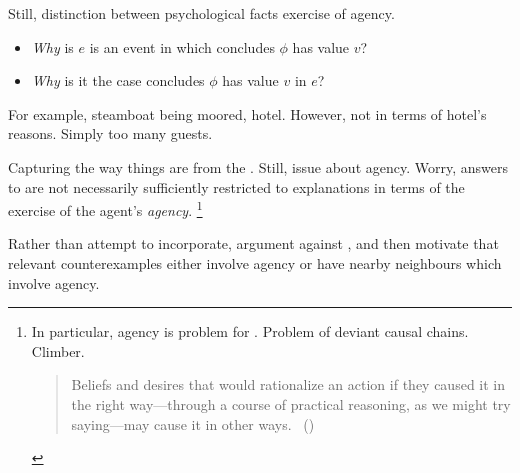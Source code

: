 \begin{note}
  Still, distinction between psychological facts exercise of agency.

  \begin{itemize}
  \item
    \emph{Why} is \(e\) is an event in which \vAgent{} concludes \(\phi\) has value \(v\)?
  \item
    \emph{Why} is it the case \vAgent{} concludes \(\phi\) has value \(v\) in \(e\)?
  \end{itemize}

  For example, steamboat being moored, hotel.
  However, not in terms of hotel's reasons.
  Simply too many guests.

  Capturing the way things are from the \agpe{}.
  Still, issue about agency.
  Worry, answers to \qWhy{} are not necessarily sufficiently restricted to explanations in terms of the exercise of the agent's \emph{agency}.%
  \footnote{
    In particular, agency is problem for \citeauthor{Davidson:1963aa}.
    Problem of deviant causal chains.
    \citeauthor[79]{Davidson:1973vd}
    Climber.
    \begin{quote}
      Beliefs and desires that would rationalize an action if they caused it in the right way—through a course of practical reasoning, as we might try saying---may cause it in other ways.%
      \mbox{ }\hfill\mbox{(\citeyear[79]{Davidson:1973vd})}
    \end{quote}
  }
\end{note}

\begin{note}
  Rather than attempt to incorporate, argument against \issueInclusion{}, and then motivate that relevant counterexamples either involve agency or have nearby neighbours which involve agency.
\end{note}


